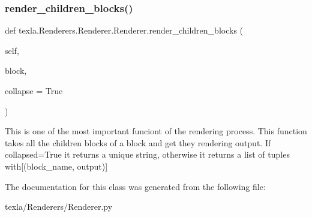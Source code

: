 \subsubsection{\texorpdfstring{render\+\_\+children\+\_\+blocks()}{render\_children\_blocks()}}
{\footnotesize\ttfamily def texla.\+Renderers.\+Renderer.\+Renderer.\+render\+\_\+children\+\_\+blocks (\begin{DoxyParamCaption}\item[{}]{self,  }\item[{}]{block,  }\item[{}]{collapse = {\ttfamily True} }\end{DoxyParamCaption})}

\begin{DoxyVerb}This is one of the most important funciont
of the rendering process.
This function takes all the children blocks of
a block and get they rendering output.
If collapsed=True it returns a unique string,
otherwise it returns a list of tuples with[(block_name, output)]
\end{DoxyVerb}
 

The documentation for this class was generated from the following file\+:\begin{DoxyCompactItemize}
\item 
texla/\+Renderers/Renderer.\+py\end{DoxyCompactItemize}
